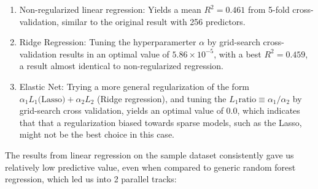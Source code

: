 \documentclass[11pt]{article}
\begin{document}
\begin{enumerate}

\item Non-regularized linear regression: Yields a mean $R^2 = 0.461$ from 5-fold cross-validation, similar to the original result with 256 predictors.
\item Ridge Regression: Tuning the hyperparamerter $\alpha$ by grid-search cross-validation results in an optimal value of $5.86 \times 10^{-5}$, with a best $R^2 = 0.459$, a result almost identical to non-regularized regression. 
\item Elastic Net: Trying a more general regularization of the form $\alpha_1 L_1 \textrm{(Lasso)} + \alpha_2 L_2$ (Ridge regression), and tuning the $L_1 \textrm{ratio} \equiv \alpha_1/\alpha_2$ by grid-search cross validation, yields an optimal value of 0.0, which indicates that that a regularization biased towards sparse models, such as the Lasso, might not be the best choice in this case.

\end{enumerate}

The results from linear regression on the sample dataset consistently gave us relatively low predictive value, even when compared to generic random forest regression, which led us into 2 parallel tracks:
\end{document}
